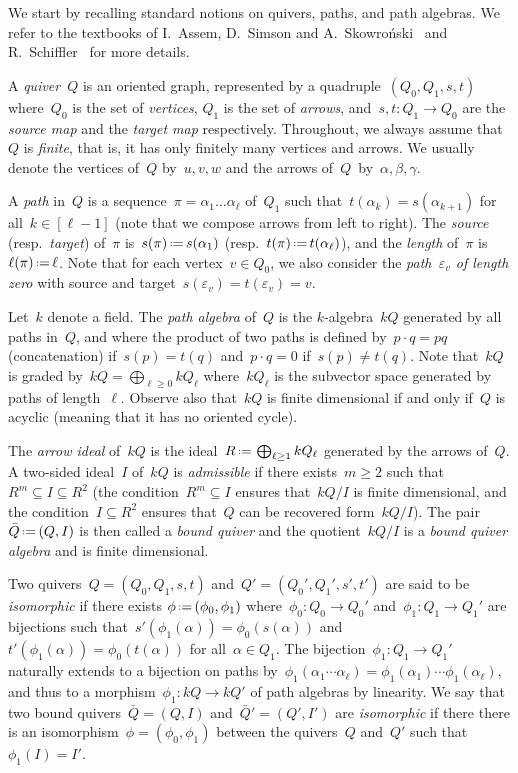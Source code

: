 \documentclass{amsart}
\theoremstyle{definition}
\newcommand{\eqdef}{\mbox{\,\raisebox{0.2ex}{\scriptsize\ensuremath{\mathrm:}}\ensuremath{=}\,}} %
\newcommand{\darkblue}{\color{darkblue}} %
\newcommand{\defn}[1]{\textsl{\darkblue #1}} %
\begin{document}
We start by recalling standard notions on quivers, paths, and path algebras.
We refer to the textbooks of I.~Assem, D.~Simson and A.~Skowro\'nski~\cite{AssemSimsonSkowronski} and R.~Schiffler~\cite{Schiffler} for more details.

A \defn{quiver}~$Q$ is an oriented graph, represented by a quadruple~$(Q_0, Q_1, s, t)$ where~$Q_0$ is the set of \defn{vertices}, $Q_1$ is the set of \defn{arrows}, and~$s, t : Q_1 \to Q_0$ are the \defn{source map} and the \defn{target map} respectively.
Throughout, we always assume that~$Q$ is \defn{finite}, that is, it has only finitely many vertices and arrows.
We usually denote the vertices of~$Q$ by~$u,v,w$ and the arrows of~$Q$~by~$\alpha, \beta, \gamma$.

A \defn{path} in~$Q$ is a sequence~$\pi = \alpha_1 \dots \alpha_\ell$ of~$Q_1$ such that~$t(\alpha_k) = s(\alpha_{k+1})$ for all~${k \in [\ell-1]}$ (note that we compose arrows from left to right).
The \defn{source} (resp.~\defn{target}) of~$\pi$ is~$s(\pi) \eqdef s(\alpha_1)$ (resp.~$t(\pi) \eqdef t(\alpha_\ell)$), and the \defn{length} of~$\pi$ is~$\ell(\pi) \eqdef \ell$.
Note that for each vertex~$v \in Q_0$, we also consider the \defn{path~$\varepsilon_v$ of length zero} with source and target~$s(\varepsilon_v) = t(\varepsilon_v) = v$.

Let~$k$ denote a field.
The \defn{path algebra} of~$Q$ is the $k$-algebra~$kQ$ generated by all paths in~$Q$, and where the product of two paths is defined by~$p \cdot q = pq$ (concatenation) if~$s(p) = t(q)$ and~$p \cdot q = 0$ if~$s(p) \ne t(q)$.
Note that~$kQ$ is graded by~$kQ = \bigoplus_{\ell \ge 0} kQ_\ell$ where~$kQ_\ell$ is the subvector space generated by paths of length~$\ell$.
Observe also that~$kQ$ is finite dimensional if and only if~$Q$ is acyclic (meaning that it has no oriented cycle).

The \defn{arrow ideal} of~$kQ$ is the ideal~$R \eqdef \bigoplus_{\ell \ge 1} kQ_\ell$ generated by the arrows of~$Q$.
A two-sided ideal~$I$ of~$kQ$ is \defn{admissible} if there exists~$m \ge 2$ such that~$R^m \subseteq I \subseteq R^2$ (the condition~$R^m \subseteq I$ ensures that~$kQ/I$ is finite dimensional, and the condition~$I \subseteq R^2$ ensures that~$Q$ can be recovered form~$kQ/I$).
The pair~$\bar Q \eqdef (Q,I)$ is then called a \defn{bound quiver} and the quotient~$kQ/I$ is a \defn{bound quiver algebra} and is finite dimensional.

Two quivers~$Q = (Q_0, Q_1, s, t)$ and~$Q' = (Q_0', Q_1', s', t')$ are said to be \defn{isomorphic} if there exists $\phi \eqdef (\phi_0, \phi_1)$ where~$\phi_0 : Q_0 \to Q_0'$ and~$\phi_1 : Q_1 \to Q_1'$ are bijections such that~${s'(\phi_1(\alpha)) = \phi_0(s(\alpha))}$ and~${t'(\phi_1(\alpha)) = \phi_0(t(\alpha))}$ for all~$\alpha \in Q_1$.
The bijection~$\phi_1 : Q_1 \to Q_1'$ naturally extends to a bijection on paths by~$\phi_1(\alpha_1 \cdots \alpha_\ell) = \phi_1(\alpha_1) \cdots \phi_1(\alpha_\ell)$, and thus to a morphism~$\phi_1 : kQ \to kQ'$ of path algebras by linearity.
We say that two bound quivers~$\bar Q = (Q,I)$ and~$\bar Q' = (Q',I')$ are \defn{isomorphic} if there there is an isomorphism~$\phi = (\phi_0, \phi_1)$ between the quivers~$Q$ and~$Q'$ such that~$\phi_1(I) = I'$.
\end{document}
